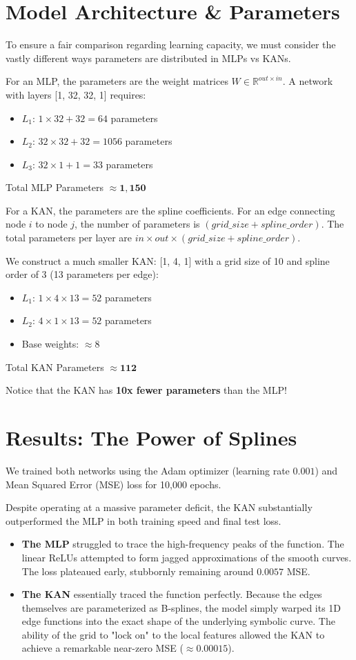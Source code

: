 \documentclass[12pt]{article}
\begin{document}
\section*{Model Architecture \& Parameters}
To ensure a fair comparison regarding learning capacity, we must consider the vastly different ways parameters are distributed in MLPs vs KANs.

For an MLP, the parameters are the weight matrices $W \in \mathbb{R}^{out \times in}$. A network with layers [1, 32, 32, 1] requires:
\begin{itemize}
    \item $L_1$: $1 \times 32 + 32 = 64$ parameters
    \item $L_2$: $32 \times 32 + 32 = 1056$ parameters
    \item $L_3$: $32 \times 1 + 1 = 33$ parameters
\end{itemize}
Total MLP Parameters $\approx \mathbf{1,150}$

For a KAN, the parameters are the spline coefficients. For an edge connecting node $i$ to node $j$, the number of parameters is $(grid\_size + spline\_order)$. The total parameters per layer are $in \times out \times (grid\_size + spline\_order)$.

We construct a much smaller KAN: [1, 4, 1] with a grid size of 10 and spline order of 3 (13 parameters per edge):
\begin{itemize}
    \item $L_1$: $1 \times 4 \times 13 = 52$ parameters
    \item $L_2$: $4 \times 1 \times 13 = 52$ parameters
    \item Base weights: $\approx 8$
\end{itemize}
Total KAN Parameters $\approx \mathbf{112}$

Notice that the KAN has \textbf{10x fewer parameters} than the MLP!

\section*{Results: The Power of Splines}
We trained both networks using the Adam optimizer (learning rate $0.001$) and Mean Squared Error (MSE) loss for 10,000 epochs. 

Despite operating at a massive parameter deficit, the KAN substantially outperformed the MLP in both training speed and final test loss.

\begin{itemize}
    \item \textbf{The MLP} struggled to trace the high-frequency peaks of the function. The linear ReLUs attempted to form jagged approximations of the smooth curves. The loss plateaued early, stubbornly remaining around $0.0057$ MSE.
    \item \textbf{The KAN} essentially traced the function perfectly. Because the edges themselves are parameterized as B-splines, the model simply warped its 1D edge functions into the exact shape of the underlying symbolic curve. The ability of the grid to "lock on" to the local features allowed the KAN to achieve a remarkable near-zero MSE ($\approx 0.00015$).
\end{itemize}
\end{document}
